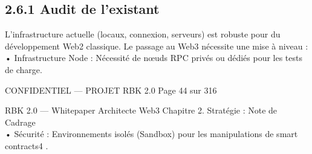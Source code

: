 \documentclass[12pt,landscape,a4paper]{article}
\newenvironment{confidential}
{\begin{tcolorbox}[
    colback=rbkred!5!white,
    colframe=rbkred!75!black,
    title=CONFIDENTIEL,
    fonttitle=\bfseries\color{white},
    coltitle=rbkred!75!black,
    breakable,
    enhanced,
    frame hidden,
    borderline west={2pt}{0pt}{rbkred!75!black}
]}
{\end{tcolorbox}}
\begin{document}
\subsection{2.6.1 Audit de l’existant}
L’infrastructure actuelle (locaux, connexion, serveurs) est robuste pour du développement Web2 classique. Le passage au Web3 nécessite une mise à niveau :\\
• Infrastructure Node : Nécessité de nœuds RPC privés ou dédiés pour les tests de charge.\\
\vspace{0.5em}
\vspace{0.5em}
\vspace{0.5em}
\begin{confidential}CONFIDENTIEL — PROJET RBK 2.0                                                Page 44 sur 316\end{confidential}
RBK 2.0 — Whitepaper Architecte Web3                                                                                         Chapitre 2. Stratégie : Note de Cadrage\\
\vspace{0.5em}
\vspace{0.5em}
• Sécurité : Environnements isolés (Sandbox) pour les manipulations de smart contracts4 .\\
\vspace{0.5em}
\vspace{0.5em}
\end{document}
